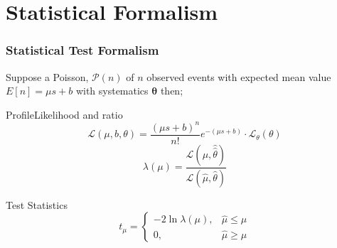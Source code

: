 \documentclass[12pt]{beamer}
\begin{document}
\section{Statistical Formalism}
\begin{frame}
\frametitle{Statistical Test Formalism} 
\begin{minipage}{\textwidth}
Suppose a Poisson, $\mathcal{P}(n)$ of $n$ observed events with expected mean value $E[n] = \mu s + b$ 
 with systematics $\mathbf{\theta}$  then;
\end{minipage}\hfill


\begin{minipage}{\textwidth}

 \begin{varblock}[7cm]{ProfileLikelihood and ratio}
  \begin{equation*}\label{eq:LL}
   \mathcal{L}(\mu, b,\theta) = \frac{(\mu s + b)^{n}}{n!}e^{-(\mu s + b)}\cdot \mathcal{L_{\theta}}(\theta) 
  \end{equation*}
  \begin{equation*}
   \lambda(\mu) = \frac{\mathcal{L}(\mu,\hat{\hat{\theta}})}{\mathcal{L}(\hat{\mu},\hat{\theta})} 
  \end{equation*}
 \end{varblock}
\end{minipage}
\begin{minipage}{\textwidth}
\begin{varblock}[7cm]{Test Statistics}
\[\label{eq:HNULL}
 t_{\mu} = \left\lbrace  
  \begin{array}{ll}
 -2\ln \lambda(\mu), & \hat{\mu} \leq \mu \\
   0,              & \hat{\mu} \geq \mu
  \end{array}
  \right.
\]
\end{varblock}
\end{minipage}
\end{frame}
\end{document}
